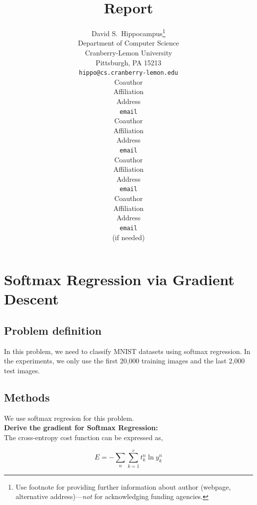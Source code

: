 \documentclass{article} %
\title{Report}
\author{
David S.~Hippocampus\thanks{ Use footnote for providing further information
about author (webpage, alternative address)---\emph{not} for acknowledging
funding agencies.} \\
Department of Computer Science\\
Cranberry-Lemon University\\
Pittsburgh, PA 15213 \\
\texttt{hippo@cs.cranberry-lemon.edu} \\
\And
Coauthor \\
Affiliation \\
Address \\
\texttt{email} \\
\AND
Coauthor \\
Affiliation \\
Address \\
\texttt{email} \\
\And
Coauthor \\
Affiliation \\
Address \\
\texttt{email} \\
\And
Coauthor \\
Affiliation \\
Address \\
\texttt{email} \\
(if needed)\\
}
\begin{document}
\maketitle

\section{Softmax Regression via Gradient Descent}
\subsection{Problem definition}
In this problem, we need to classify MNIST datasets using softmax regression. In the experiments, we only use the first 20,000 training images and the last 2,000 test images.

\subsection{Methods}
We use softmax regresion for this problem. \\
\textbf{Derive the gradient for Softmax Regression:} \\
The cross-entropy cost function can be expressed as,

\begin{equation}
	E = - \sum_{n}\sum_{k=1}^{c}t_k^n\ln y_k^n
\end{equation}
\end{document}
